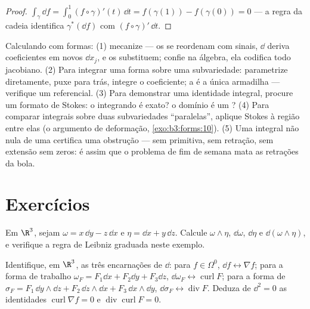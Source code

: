 \begin{proof}
$\int_\gamma\dd f = \int_0^1(f\circ\gamma)'(t)\,\dd t =
f(\gamma(1)) - f(\gamma(0)) = 0$ --- a regra da cadeia identifica $\gamma^*(\dd f)$ com $(f\circ\gamma)'\,\dd t$.
\end{proof}

\begin{method}\label{met:b3:forms:method}
Calculando com formas: (1) mecanize --- os  se
reordenam com sinais, $\dd$ deriva coeficientes em novos $\dd
x_j$, e os
 substituem; confie na álgebra, ela codifica todo jacobiano.
(2) Para integrar uma forma sobre uma subvariedade: parametrize
diretamente, puxe para trás, integre o coeficiente; a  é a
única armadilha --- verifique um referencial. (3) Para demonstrar uma
identidade integral, procure um formato de Stokes: o integrando é exato?
o domínio é um ? (4) Para comparar integrais sobre duas
subvariedades ``paralelas'', aplique Stokes à região entre elas (o
argumento de deformação, \cref{exo:b3:forms:10}). (5) Uma integral não nula de
uma  certifica uma obstrução  --- sem primitiva,
sem retração, sem extensão sem zeros: é assim que o problema de fim de
semana mata as retrações da bola.
\end{method}

\section{Exercícios}

\begin{exercise}[$\star$]\label{exo:b3:forms:1}
Em $\R^3$, sejam $\omega = x\,\dd y - z\,\dd x$ e $\eta =
\dd x + y\,\dd z$. Calcule $\omega\wedge\eta$, $\dd\omega$, $\dd\eta$ e $\dd(\omega\wedge\eta)$,
e verifique a regra de Leibniz graduada neste exemplo.
\end{exercise}

\begin{exercise}[$\star$]\label{exo:b3:forms:2}
Identifique, em $\R^3$, as três encarnações de $\dd$: para $f \in \Omega^0$,
$\dd f \leftrightarrow \nabla f$; para a forma de trabalho $\omega_F = F_1\dd x + F_2\dd y + F_3\dd z$, $\dd\omega_F \leftrightarrow \operatorname{curl}F$; para a forma de 
$\sigma_F = F_1\,\dd y\wedge\dd z + F_2\,\dd
z\wedge\dd x + F_3\,\dd x\wedge\dd y$, $\dd\sigma_F
\leftrightarrow \operatorname{div}F$. Deduza de $\dd^2 =
0$ as identidades $\operatorname{curl}\nabla f = 0$ e $\operatorname{div}\operatorname{curl}F = 0$.
\end{exercise}

